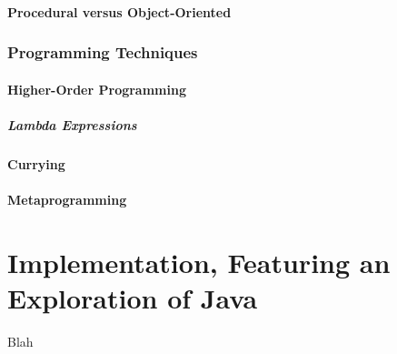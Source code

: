 
\subsection{Procedural versus Object-Oriented}


\toclineskip
\section{Programming Techniques}

\subsection{Higher-Order Programming}

\subsubsection{Lambda Expressions}

\subsection{Currying}

\subsection{Metaprogramming}

\newpage



\part*{Implementation, Featuring an Exploration of Java}

Blah \\

